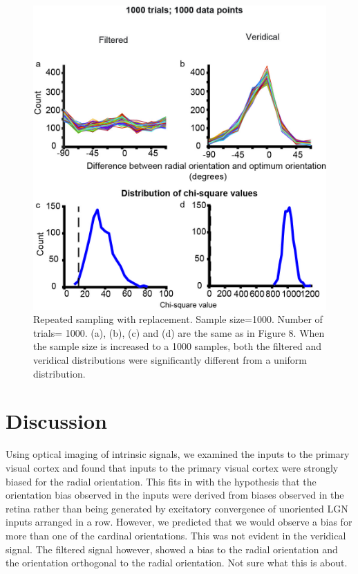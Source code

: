 				\begin{figure}
					
					\includegraphics[width=\linewidth]{rb/S4.jpg}
					\caption{Repeated sampling with replacement. Sample size=1000. Number of trials= 1000. (a), (b), (c) and (d) are the same as in Figure 8. When the sample size is increased to a 1000 samples, both the filtered and veridical distributions were significantly different from a uniform distribution.}
					\label{fig:fig9}
				\end{figure}
				
	
				\pagebreak
				
	\section{Discussion}
		
		Using optical imaging of intrinsic signals, we examined the inputs to the primary visual cortex and found that inputs to the primary visual cortex were strongly biased for the radial orientation. This fits in with the hypothesis that the orientation bias observed in the inputs were derived from biases observed in the retina rather than being generated by excitatory convergence of unoriented LGN inputs arranged in a row. However, we predicted that we would observe a bias for more than one of the cardinal orientations. This was not evident in the veridical signal. The filtered signal however, showed a bias to the radial orientation and the orientation orthogonal to the radial orientation. Not sure what this is about.
		
